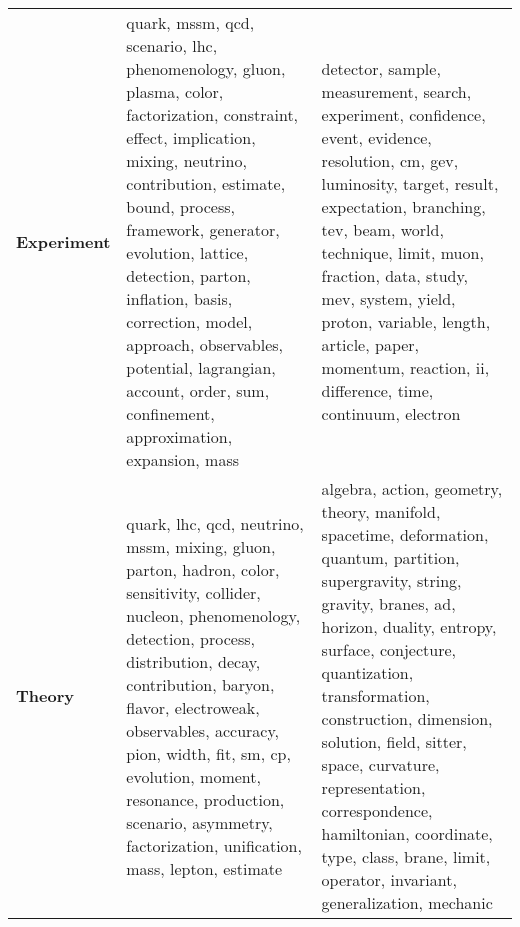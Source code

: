 \begin{longtable}{p{3cm}|p{5cm}|p{5cm}}
\bottomrule
\endlastfoot
\textbf{Experiment} &  quark, mssm, qcd, scenario, lhc, phenomenology, gluon, plasma, color, factorization, constraint, effect, implication, mixing, neutrino, contribution, estimate, bound, process, framework, generator, evolution, lattice, detection, parton, inflation, basis, correction, model, approach, observables, potential, lagrangian, account, order, sum, confinement, approximation, expansion, mass &                                                                    detector, sample, measurement, search, experiment, confidence, event, evidence, resolution, cm, gev, luminosity, target, result, expectation, branching, tev, beam, world, technique, limit, muon, fraction, data, study, mev, system, yield, proton, variable, length, article, paper, momentum, reaction, ii, difference, time, continuum, electron \\
\textbf{Theory    } &                      quark, lhc, qcd, neutrino, mssm, mixing, gluon, parton, hadron, color, sensitivity, collider, nucleon, phenomenology, detection, process, distribution, decay, contribution, baryon, flavor, electroweak, observables, accuracy, pion, width, fit, sm, cp, evolution, moment, resonance, production, scenario, asymmetry, factorization, unification, mass, lepton, estimate &  algebra, action, geometry, theory, manifold, spacetime, deformation, quantum, partition, supergravity, string, gravity, branes, ad, horizon, duality, entropy, surface, conjecture, quantization, transformation, construction, dimension, solution, field, sitter, space, curvature, representation, correspondence, hamiltonian, coordinate, type, class, brane, limit, operator, invariant, generalization, mechanic \\
\end{longtable}

